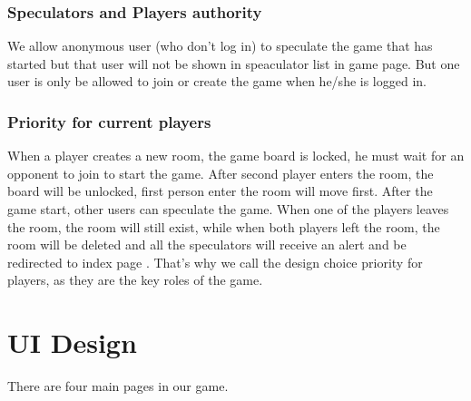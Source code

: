 \subsubsection{Speculators and Players authority} We allow anonymous user
(who don't log in) to speculate the game that has started but that user will not
be shown in speaculator list in game page. But one user is only 
be allowed to join or create the game when he/she is logged in. 

\subsubsection{Priority for current players}
When a player creates a new room, the game board is locked, he must wait for an
opponent to join to start the game. After second player enters the room, the board
will be unlocked, first person enter the room will move first. After the game 
start, other users can speculate the game. When one of the players leaves the 
room, the room will still exist, while when both players left the room, the 
room will be deleted and all the speculators will receive an alert and be 
redirected to index page . That's why we call the design choice priority for 
players, as they are the key roles of the game.

\section{UI Design}
There are four main pages in our game.
